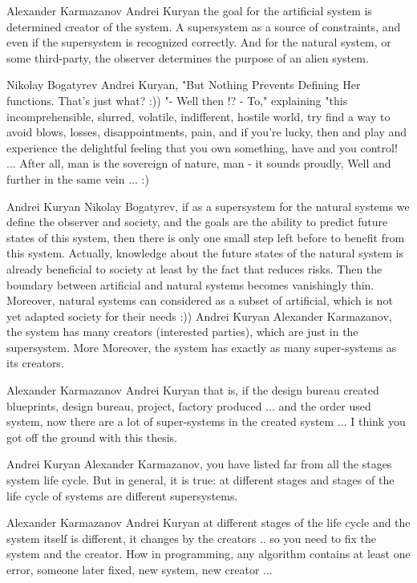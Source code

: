 \documentclass[11pt,a4paper]{article}
\begin{document}
Alexander Karmazanov Andrei Kuryan the goal for the artificial system is
determined creator of the system. A supersystem as a source of constraints,
and even if the supersystem is recognized correctly. And for the natural
system, or some third-party, the observer determines the purpose of an alien
system.

Nikolay Bogatyrev Andrei Kuryan, "But Nothing Prevents Defining Her
functions. That's just what? :)) "- Well then !? - To," explaining "this
incomprehensible, slurred, volatile, indifferent, hostile world, try find a
way to avoid blows, losses, disappointments, pain, and if you're lucky, then
and play and experience the delightful feeling that you own something, have
and you control! ... After all, man is the sovereign of nature, man - it
sounds proudly, Well and further in the same vein ... :)

Andrei Kuryan Nikolay Bogatyrev, if as a supersystem for the natural systems
we define the observer and society, and the goals are the ability to predict
future states of this system, then there is only one small step left before to
benefit from this system. Actually, knowledge about the future states of the
natural system is already beneficial to society at least by the fact that
reduces risks. Then the boundary between artificial and natural systems
becomes vanishingly thin. Moreover, natural systems can considered as a subset
of artificial, which is not yet adapted society for their needs :))
Andrei Kuryan Alexander Karmazanov, the system has many creators
(interested parties), which are just in the supersystem. More
Moreover, the system has exactly as many super-systems as its creators.

Alexander Karmazanov Andrei Kuryan that is, if the design bureau created
blueprints, design bureau, project, factory produced ... and the order used
system, now there are a lot of super-systems in the created system ... I think
you got off the ground with this thesis.

Andrei Kuryan Alexander Karmazanov, you have listed far from all the stages
system life cycle. But in general, it is true: at different stages and stages
of the life cycle of systems are different supersystems.

Alexander Karmazanov Andrei Kuryan at different stages of the life cycle and
the system itself is different, it changes by the creators .. so you need to
fix the system and the creator. How in programming, any algorithm contains at
least one error, someone later fixed, new system, new creator ...
\end{document}
